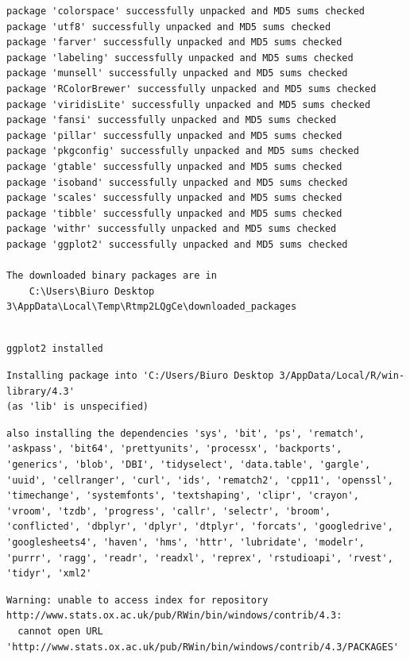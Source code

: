 \documentclass[
  11pt,
]{article}
\begin{document}
\begin{verbatim}
package 'colorspace' successfully unpacked and MD5 sums checked
package 'utf8' successfully unpacked and MD5 sums checked
package 'farver' successfully unpacked and MD5 sums checked
package 'labeling' successfully unpacked and MD5 sums checked
package 'munsell' successfully unpacked and MD5 sums checked
package 'RColorBrewer' successfully unpacked and MD5 sums checked
package 'viridisLite' successfully unpacked and MD5 sums checked
package 'fansi' successfully unpacked and MD5 sums checked
package 'pillar' successfully unpacked and MD5 sums checked
package 'pkgconfig' successfully unpacked and MD5 sums checked
package 'gtable' successfully unpacked and MD5 sums checked
package 'isoband' successfully unpacked and MD5 sums checked
package 'scales' successfully unpacked and MD5 sums checked
package 'tibble' successfully unpacked and MD5 sums checked
package 'withr' successfully unpacked and MD5 sums checked
package 'ggplot2' successfully unpacked and MD5 sums checked

The downloaded binary packages are in
    C:\Users\Biuro Desktop 3\AppData\Local\Temp\Rtmp2LQgCe\downloaded_packages
\end{verbatim}

\begin{verbatim}

ggplot2 installed
\end{verbatim}

\begin{verbatim}
Installing package into 'C:/Users/Biuro Desktop 3/AppData/Local/R/win-library/4.3'
(as 'lib' is unspecified)
\end{verbatim}

\begin{verbatim}
also installing the dependencies 'sys', 'bit', 'ps', 'rematch', 'askpass', 'bit64', 'prettyunits', 'processx', 'backports', 'generics', 'blob', 'DBI', 'tidyselect', 'data.table', 'gargle', 'uuid', 'cellranger', 'curl', 'ids', 'rematch2', 'cpp11', 'openssl', 'timechange', 'systemfonts', 'textshaping', 'clipr', 'crayon', 'vroom', 'tzdb', 'progress', 'callr', 'selectr', 'broom', 'conflicted', 'dbplyr', 'dplyr', 'dtplyr', 'forcats', 'googledrive', 'googlesheets4', 'haven', 'hms', 'httr', 'lubridate', 'modelr', 'purrr', 'ragg', 'readr', 'readxl', 'reprex', 'rstudioapi', 'rvest', 'tidyr', 'xml2'
\end{verbatim}

\begin{verbatim}
Warning: unable to access index for repository http://www.stats.ox.ac.uk/pub/RWin/bin/windows/contrib/4.3:
  cannot open URL 'http://www.stats.ox.ac.uk/pub/RWin/bin/windows/contrib/4.3/PACKAGES'
\end{verbatim}
\end{document}
